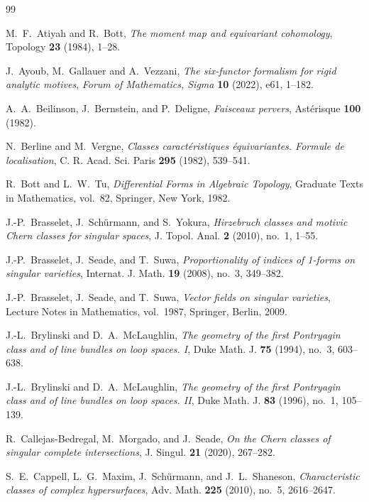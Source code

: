 \documentclass[10pt,a4paper,dvipsnames,x11names]{amsart}
\numberwithin{equation}{section}
\theoremstyle{plain}
\theoremstyle{definition}
\theoremstyle{remark}
\begin{document}
\begin{thebibliography}{99}


M.~F.~Atiyah and R.~Bott,
\emph{The moment map and equivariant cohomology},
Topology \textbf{23} (1984), 1--28.

J.~Ayoub, M.~Gallauer and A.~Vezzani,
\emph{The six-functor formalism for rigid analytic motives},
\emph{Forum of Mathematics, Sigma} \textbf{10} (2022), e61, 1--182.

A.~A.~Beilinson, J.~Bernstein, and P.~Deligne,
\emph{Faisceaux pervers},
Ast\'erisque \textbf{100} (1982).

N.~Berline and M.~Vergne,
\emph{Classes caract\'eristiques \'equivariantes. Formule de localisation},
C. R. Acad. Sci. Paris \textbf{295} (1982), 539--541.

R.~Bott and L.~W.~Tu,
\emph{Differential Forms in Algebraic Topology},
Graduate Texts in Mathematics, vol.~82, Springer, New York, 1982.

J.-P.~Brasselet, J.~Sch\"urmann, and S.~Yokura,
\emph{Hirzebruch classes and motivic Chern classes for singular spaces},
J. Topol. Anal. \textbf{2} (2010), no.~1, 1--55.

J.-P.~Brasselet, J.~Seade, and T.~Suwa,
\emph{Proportionality of indices of 1-forms on singular varieties},
Internat. J. Math. \textbf{19} (2008), no.~3, 349--382.

J.-P.~Brasselet, J.~Seade, and T.~Suwa,
\emph{Vector fields on singular varieties},
Lecture Notes in Mathematics, vol.~1987, Springer, Berlin, 2009.

J.-L.~Brylinski and D.~A.~McLaughlin,
\emph{The geometry of the first Pontryagin class and of line bundles on loop spaces. I},
Duke Math. J. \textbf{75} (1994), no.~3, 603--638.

J.-L.~Brylinski and D.~A.~McLaughlin,
\emph{The geometry of the first Pontryagin class and of line bundles on loop spaces. II},
Duke Math. J. \textbf{83} (1996), no.~1, 105--139.

R.~Callejas-Bedregal, M.~Morgado, and J.~Seade,
\emph{On the Chern classes of singular complete intersections},
J. Singul. \textbf{21} (2020), 267--282.


S.~E.~Cappell, L.~G.~Maxim, J.~Sch\"urmann, and J.~L.~Shaneson,
\emph{Characteristic classes of complex hypersurfaces},
Adv. Math. \textbf{225} (2010), no.~5, 2616--2647.


\end{thebibliography}
\end{document}
